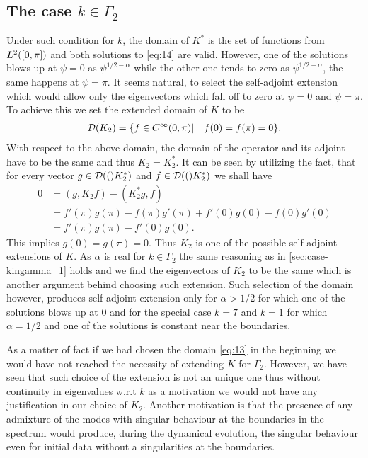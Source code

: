 \subsection{The case $k\in\Gamma_2$}
\label{sec:case-kingamma_2}

Under such condition for $k$, the domain of $K^*$ is the set of
functions from $L^2([0,\pi])$ and both solutions to \eqref{eq:14} are
valid. However, one of the solutions blows-up at $\psi=0$ as
$\psi^{1/2-\alpha}$ while the other one tends to zero as
$\psi^{1/2+\alpha}$, the same happens at $\psi=\pi$. It seems natural,
to select the self-adjoint extension which would allow only the
eigenvectors which fall off to zero at $\psi=0$ and $\psi=\pi$.
To achieve this we set the extended domain of $K$ to be
\begin{align}
  \label{eq:13}
  \mathcal{D}(K_2)=\{f\in C^\infty(0,\pi)|\quad f(0)=f(\pi)=0\}.
\end{align}
With respect to the above domain, the domain of the operator and its
adjoint have to be the same and thus $K_2=K_2^*$. It can be
seen by utilizing the fact, that for every vector $g\in\mathcal{D}(()K_2^*)$
and $f\in\mathcal{D}(()K_2^*)$ we shall have
\begin{align}
  \label{eq:17}
  0&=(g,K_2 f)-(K_2^*g,f)\\
  &=f'(\pi)g(\pi)-f(\pi)g'(\pi)+f'(0)g(0)-f(0)g'(0)\\
  &=f'(\pi)g(\pi)-f'(0)g(0).
\end{align}
This implies $g(0)=g(\pi)=0$. Thus $K_2$ is one of the possible
self-adjoint extensions of $K$. As $\alpha$ is real for $k\in\Gamma_2$
the same reasoning as in \ref{sec:case-kingamma_1} holds and we find
the eigenvectors of $K_2$ to be the same which is another argument
behind choosing such extension. Such selection of the domain however,
produces self-adjoint extension only for $\alpha>1/2$ for which one of
the solutions blows up at $0$ and for the special case $k=7$ and $k=1$
for which $\alpha=1/2$ and one of the solutions is constant near the
boundaries.

As a matter of fact if we had chosen the domain \eqref{eq:13} in the
beginning we would have not reached the necessity of extending $K$ for
$\Gamma_2$. However, we have seen that such choice of the extension is
not an unique one thus without continuity in eigenvalues w.r.t $k$ as
a motivation we would not have any justification in our choice of
$K_2$. Another motivation is that the presence of any admixture of the
modes with singular behaviour at the boundaries in the spectrum would
produce, during the dynamical evolution, the singular behaviour even
for initial data without a singularities at the boundaries.


